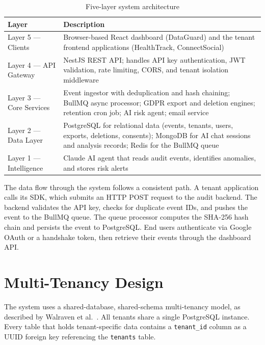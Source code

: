 \documentclass[a4paper,12pt,onecolumn]{report}
\begin{document}
\begin{table}[h]
    \begin{center}
        \begin{tabularx}{\textwidth}{|l|X|}
            \hline
            \textbf{Layer} & \textbf{Description} \\
            \hline
            Layer 5 --- Clients & Browser-based React dashboard (DataGuard) and the tenant frontend applications (HealthTrack, ConnectSocial) \\
            \hline
            Layer 4 --- API Gateway & NestJS REST API; handles API key authentication, JWT validation, rate limiting, CORS, and tenant isolation middleware \\
            \hline
            Layer 3 --- Core Services & Event ingestor with deduplication and hash chaining; BullMQ async processor; GDPR export and deletion engines; retention cron job; AI risk agent; email service \\
            \hline
            Layer 2 --- Data Layer & PostgreSQL for relational data (events, tenants, users, exports, deletions, consents); MongoDB for AI chat sessions and analysis records; Redis for the BullMQ queue \\
            \hline
            Layer 1 --- Intelligence & Claude AI agent that reads audit events, identifies anomalies, and stores risk alerts \\
            \hline
        \end{tabularx}
    \end{center}
    \caption{Five-layer system architecture}
    \label{tab:architecture}
\end{table}

The data flow through the system follows a consistent path.
A tenant application calls its SDK, which submits an HTTP POST request to the audit backend.
The backend validates the API key, checks for duplicate event IDs, and pushes the event to the BullMQ queue.
The queue processor computes the SHA-256 hash chain and persists the event to PostgreSQL.
End users authenticate via Google OAuth or a handshake token, then retrieve their events through the dashboard API.

\section{Multi-Tenancy Design}

The system uses a shared-database, shared-schema multi-tenancy model, as described by Walraven et al.\ \cite{walraven2011}.
All tenants share a single PostgreSQL instance.
Every table that holds tenant-specific data contains a \texttt{tenant\_id} column as a UUID foreign key referencing the \texttt{tenants} table.
\end{document}
